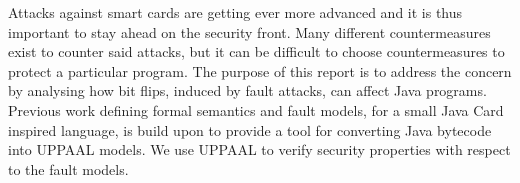 Attacks against smart cards are getting ever more advanced and it is thus important to stay ahead on the security front. 
Many different countermeasures exist to counter said attacks, but it can be difficult to choose countermeasures to protect a particular program. 
The purpose of this report is to address the concern by analysing how bit flips, induced by fault attacks, can affect Java programs. Previous work defining formal semantics and fault models, for a small Java Card inspired language, is build upon to provide a tool for converting Java bytecode into UPPAAL models. We use UPPAAL to verify security properties with respect to the fault models.


